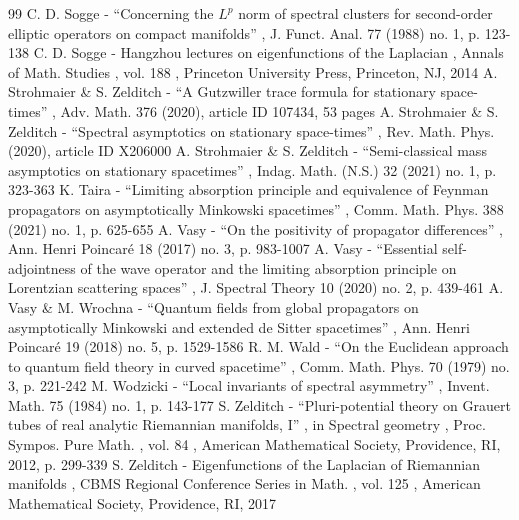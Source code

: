 \begin{thebibliography}{99}
 C. D. Sogge - “Concerning the $L^p$ norm of spectral clusters for second-order elliptic operators on compact manifolds” , J. Funct. Anal. 77 (1988) no. 1, p. 123-138
 C. D. Sogge - Hangzhou lectures on eigenfunctions of the Laplacian , Annals of Math. Studies , vol. 188 , Princeton University Press, Princeton, NJ, 2014
 A. Strohmaier \& S. Zelditch - “A Gutzwiller trace formula for stationary space-times” , Adv. Math. 376 (2020), article ID 107434, 53 pages
 A. Strohmaier \& S. Zelditch - “Spectral asymptotics on stationary space-times” , Rev. Math. Phys. (2020), article ID X206000
 A. Strohmaier \& S. Zelditch - “Semi-classical mass asymptotics on stationary spacetimes” , Indag. Math. (N.S.) 32 (2021) no. 1, p. 323-363
 K. Taira - “Limiting absorption principle and equivalence of Feynman propagators on asymptotically Minkowski spacetimes” , Comm. Math. Phys. 388 (2021) no. 1, p. 625-655
 A. Vasy - “On the positivity of propagator differences” , Ann. Henri Poincaré 18 (2017) no. 3, p. 983-1007
 A. Vasy - “Essential self-adjointness of the wave operator and the limiting absorption principle on Lorentzian scattering spaces” , J. Spectral Theory 10 (2020) no. 2, p. 439-461
 A. Vasy \& M. Wrochna - “Quantum fields from global propagators on asymptotically Minkowski and extended de Sitter spacetimes” , Ann. Henri Poincaré 19 (2018) no. 5, p. 1529-1586
 R. M. Wald - “On the Euclidean approach to quantum field theory in curved spacetime” , Comm. Math. Phys. 70 (1979) no. 3, p. 221-242
 M. Wodzicki - “Local invariants of spectral asymmetry” , Invent. Math. 75 (1984) no. 1, p. 143-177
 S. Zelditch - “Pluri-potential theory on Grauert tubes of real analytic Riemannian manifolds, I” , in Spectral geometry , Proc. Sympos. Pure Math. , vol. 84 , American Mathematical Society, Providence, RI, 2012, p. 299-339
 S. Zelditch - Eigenfunctions of the Laplacian of Riemannian manifolds , CBMS Regional Conference Series in Math. , vol. 125 , American Mathematical Society, Providence, RI, 2017
\end{thebibliography}
